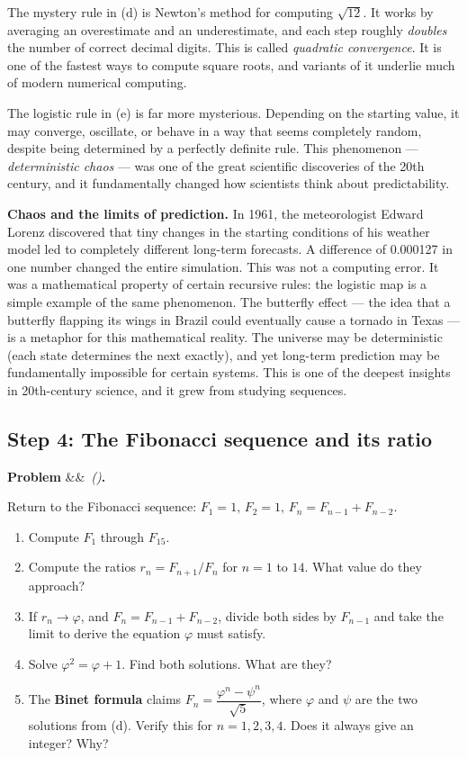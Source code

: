 \documentclass[12pt, a4paper]{article}
\newcounter{problem}
\newenvironment{problem}[1][]{%
  \refstepcounter{problem}%
  \par\vspace{6pt}%
  \noindent\textbf{\color{MidBlue}Problem \theproblem}%
  \ifx&#1&\else\ \textit{(#1)}\fi\textbf{.}\enskip
}{\par\vspace{4pt}}
\begin{document}
\medskip
The mystery rule in (d) is Newton's method for computing $\sqrt{12}$. It works by averaging an overestimate and an underestimate, and each step roughly \emph{doubles} the number of correct decimal digits. This is called \emph{quadratic convergence}. It is one of the fastest ways to compute square roots, and variants of it underlie much of modern numerical computing.

The logistic rule in (e) is far more mysterious. Depending on the starting value, it may converge, oscillate, or behave in a way that seems completely random, despite being determined by a perfectly definite rule. This phenomenon --- \emph{deterministic chaos} --- was one of the great scientific discoveries of the 20th century, and it fundamentally changed how scientists think about predictability.

\begin{thought}
\textbf{Chaos and the limits of prediction.}
In 1961, the meteorologist Edward Lorenz discovered that tiny changes in the starting conditions of his weather model led to completely different long-term forecasts. A difference of 0.000127 in one number changed the entire simulation. This was not a computing error. It was a mathematical property of certain recursive rules: the logistic map is a simple example of the same phenomenon. The butterfly effect --- the idea that a butterfly flapping its wings in Brazil could eventually cause a tornado in Texas --- is a metaphor for this mathematical reality. The universe may be deterministic (each state determines the next exactly), and yet long-term prediction may be fundamentally impossible for certain systems. This is one of the deepest insights in 20th-century science, and it grew from studying sequences.
\end{thought}

\subsection{Step 4: The Fibonacci sequence and its ratio}

\begin{problem}
\label{prob:fibonacci}
Return to the Fibonacci sequence: $F_1 = 1,\, F_2 = 1,\, F_n = F_{n-1} + F_{n-2}$.
\begin{enumerate}[label=(\alph*), topsep=2pt]
  \item Compute $F_1$ through $F_{15}$.
  \item Compute the ratios $r_n = F_{n+1}/F_n$ for $n = 1$ to $14$. What value do they approach?
  \item If $r_n \to \varphi$, and $F_n = F_{n-1} + F_{n-2}$, divide both sides by $F_{n-1}$ and take the limit to derive the equation $\varphi$ must satisfy.
  \item Solve $\varphi^2 = \varphi + 1$. Find both solutions. What are they?
  \item The \textbf{Binet formula} claims $F_n = \dfrac{\varphi^n - \psi^n}{\sqrt{5}}$, where $\varphi$ and $\psi$ are the two solutions from (d). Verify this for $n = 1, 2, 3, 4$. Does it always give an integer? Why?
\end{enumerate}
\end{problem}
\end{document}
